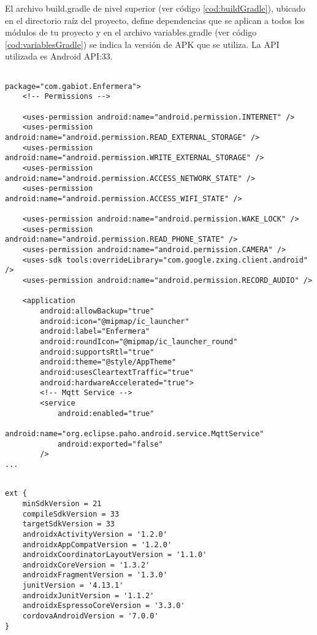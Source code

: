 El archivo build.gradle de nivel superior (ver código \ref{cod:buildGradle}), ubicado en el directorio raíz del proyecto, define dependencias que se aplican a todos los módulos de tu proyecto y en el archivo variables.gradle (ver código \ref{cod:variablesGradle}) se indica la versión de APK que se utiliza. La API utilizada es Android API:33. 

\begin{lstlisting}[label=cod:AndroidMan,caption=Modificaciones al Android Manifest.]  % Start your code-block

package="com.gabiot.Enfermera">
    <!-- Permissions -->

    <uses-permission android:name="android.permission.INTERNET" />
    <uses-permission android:name="android.permission.READ_EXTERNAL_STORAGE" />
    <uses-permission android:name="android.permission.WRITE_EXTERNAL_STORAGE" />
    <uses-permission android:name="android.permission.ACCESS_NETWORK_STATE" />
    <uses-permission android:name="android.permission.ACCESS_WIFI_STATE" />

    <uses-permission android:name="android.permission.WAKE_LOCK" />
    <uses-permission android:name="android.permission.READ_PHONE_STATE" />
    <uses-permission android:name="android.permission.CAMERA" />
    <uses-sdk tools:overrideLibrary="com.google.zxing.client.android" />
    <uses-permission android:name="android.permission.RECORD_AUDIO" />

    <application
        android:allowBackup="true"
        android:icon="@mipmap/ic_launcher"
        android:label="Enfermera"
        android:roundIcon="@mipmap/ic_launcher_round"
        android:supportsRtl="true"
        android:theme="@style/AppTheme"
        android:usesCleartextTraffic="true"
        android:hardwareAccelerated="true">
        <!-- Mqtt Service -->
        <service
            android:enabled="true"
            android:name="org.eclipse.paho.android.service.MqttService"
            android:exported="false"
        />
...

\end{lstlisting}


\begin{lstlisting}[label=cod:variablesGradle,caption= Archivo variables.gradle.]  

ext {
    minSdkVersion = 21
    compileSdkVersion = 33
    targetSdkVersion = 33
    androidxActivityVersion = '1.2.0'
    androidxAppCompatVersion = '1.2.0'
    androidxCoordinatorLayoutVersion = '1.1.0'
    androidxCoreVersion = '1.3.2'
    androidxFragmentVersion = '1.3.0'
    junitVersion = '4.13.1'
    androidxJunitVersion = '1.1.2'
    androidxEspressoCoreVersion = '3.3.0'
    cordovaAndroidVersion = '7.0.0'
}

\end{lstlisting}

